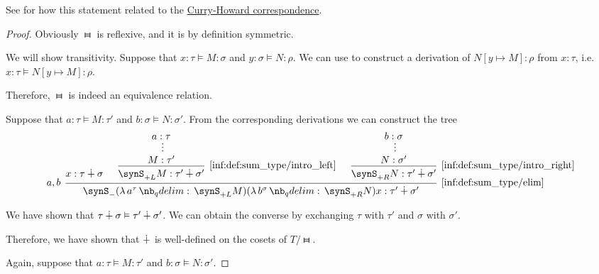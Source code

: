 \begin{comments}
  \item See  for how this statement related to the \hyperref[con:curry_howard_correspondence]{Curry-Howard correspondence}.
\end{comments}
\begin{proof}
   Obviously \( {\gleichstark} \) is reflexive, and it is by definition symmetric.

  We will show transitivity. Suppose that \( x: \tau \vDash M: \sigma \) and \( y: \sigma \vDash N: \rho \). We can use  to construct a derivation of \( N[y \mapsto M]: \rho \) from \( x: \tau \), i.e. \( x: \tau \vDash N[y \mapsto M]: \rho \).

  Therefore, \( {\gleichstark} \) is indeed an equivalence relation.

   Suppose that \( a: \tau \vDash M: \tau' \) and \( b: \sigma \vDash N: \sigma' \). From the corresponding derivations we can construct the tree
  \begin{equation*}
    \begin{prooftree}
      \hypo{ x: \tau \synplus \sigma }

      \hypo{ a: \tau }
      \ellipsis {} { M: \tau' }
      \infer1[\ref{inf:def:sum_type/intro_left}]{ \synS_{+L} M: \tau' \synplus \sigma' }

      \hypo{ b: \sigma }
      \ellipsis {} { N: \sigma' }
      \infer1[\ref{inf:def:sum_type/intro_right}]{ \synS_{+R} N: \tau' \synplus \sigma' }

      \infer[left label={\( a, b \)}]3[\ref{inf:def:sum_type/elim}]{ \synS_- (\qabs {a^\tau} \synS_{+L} M) (\qabs {b^{\sigma}} \synS_{+R} N) x: \tau' \synplus \sigma' }
    \end{prooftree}
  \end{equation*}

  We have shown that \( \tau \mathbin{\dotplus} \sigma \vDash \tau' \mathbin{\dotplus} \sigma' \). We can obtain the converse by exchanging \( \tau \) with \( \tau' \) and \( \sigma \) with \( \sigma' \).

  Therefore, we have shown that \( {\mathbin{\dotplus}} \) is well-defined on the cosets of \( T / {\gleichstark} \).

   Again, suppose that \( a: \tau \vDash M: \tau' \) and \( b: \sigma \vDash N: \sigma' \).


\end{proof}
